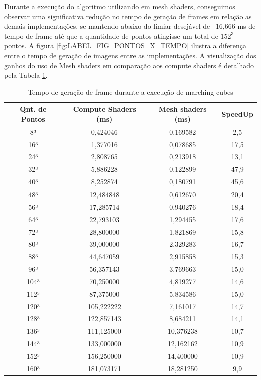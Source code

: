 Durante a execução do algoritmo utilizando em mesh shaders, conseguimos observar uma significativa redução no tempo de geração de frames em relação as demais implementações, se mantendo abaixo do limiar desejável de ~16,666 ms de tempo de frame até que a quantidade de pontos atingisse um total de $152^3$ pontos. A figura \ref{fig:LABEL_FIG_PONTOS_X_TEMPO} ilustra a diferença entre o tempo de geração de imagens entre as implementações. A visualização dos ganhos do uso de Mesh shaders em comparação aos compute shaders é detalhado pela Tabela \ref{TBL:TEMPO_FRAME_IMPL}. 

\begin{center}
\begin{table}
\begin{tabular}{|c | c | c | c |} 
 \hline
 Qnt. de Pontos & Compute Shaders (ms) & Mesh shaders (ms) & SpeedUp  \\
 \hline\hline
8³ & 0,424046 & 0,169582 & 2,5 \\ \hline
16³ & 1,377016 & 0,078685 & 17,5 \\ \hline
24³ & 2,808765 & 0,213918 & 13,1 \\ \hline
32³ & 5,886228 & 0,122899 & 47,9 \\ \hline
40³ & 8,252874 & 0,180791 & 45,6 \\ \hline
48³ & 12,484848 & 0,612670 & 20,4 \\ \hline
56³ & 17,285714 & 0,940276 & 18,4 \\ \hline
64³ & 22,793103 & 1,294455 & 17,6 \\ \hline
72³ & 28,800000 & 1,821869 & 15,8 \\ \hline
80³ & 39,000000 & 2,329283 & 16,7 \\ \hline
88³ & 44,647059 & 2,915858 & 15,3 \\ \hline
96³ & 56,357143 & 3,769663 & 15,0 \\ \hline
104³ & 70,250000 & 4,819277 & 14,6 \\ \hline
112³ & 87,375000 & 5,834586 & 15,0 \\ \hline
120³ & 105,222222 & 7,161017 & 14,7 \\ \hline
128³ & 122,857143 & 8,684211 & 14,1 \\ \hline
136³ & 111,125000 & 10,376238 & 10,7 \\ \hline
144³ & 133,000000 & 12,162162 & 10,9 \\ \hline
152³ & 156,250000 & 14,400000 & 10,9 \\ \hline
160³ & 181,073171 & 18,281250 & 9,9 \\ [1ex] \hline
\end{tabular}
\caption{Tempo de geração de frame durante a execução de marching cubes}
\label{TBL:TEMPO_FRAME_IMPL}
\end{table}
\end{center}

